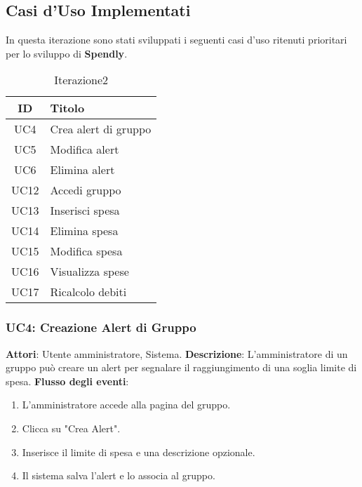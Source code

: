 \subsection{Casi d'Uso Implementati }

In questa iterazione sono stati sviluppati i seguenti casi d’uso ritenuti prioritari per lo sviluppo di \textbf{Spendly}.

\begin{table}[h]
    \centering
    \begin{tabular}{|c|l|}
    \hline
    \textbf{ID} & \textbf{Titolo} \\ \hline
    UC4 & Crea alert di gruppo\\ \hline
    UC5 & Modifica alert \\ \hline
    UC6 & Elimina alert \\ \hline
    UC12 & Accedi gruppo \\ \hline
    UC13 & Inserisci spesa \\ \hline
    UC14 & Elimina spesa \\ \hline
    UC15 & Modifica spesa \\ \hline
    UC16 & Visualizza spese \\ \hline
    UC17 & Ricalcolo debiti \\ \hline
    \end{tabular}
    \caption{Iterazione2}
\end{table}

\subsubsection{UC4: Creazione Alert di Gruppo}
\textbf{Attori}: Utente amministratore, Sistema.
\newline
\newline
\textbf{Descrizione}: L’amministratore di un gruppo può creare un alert per segnalare il raggiungimento di una soglia limite di spesa.
\newline
\newline
\textbf{Flusso degli eventi}:
\begin{enumerate}
    \item L’amministratore accede alla pagina del gruppo.
    \item Clicca su "Crea Alert".
    \item Inserisce il limite di spesa e una descrizione opzionale.
    \item Il sistema salva l’alert e lo associa al gruppo.
\end{enumerate}

